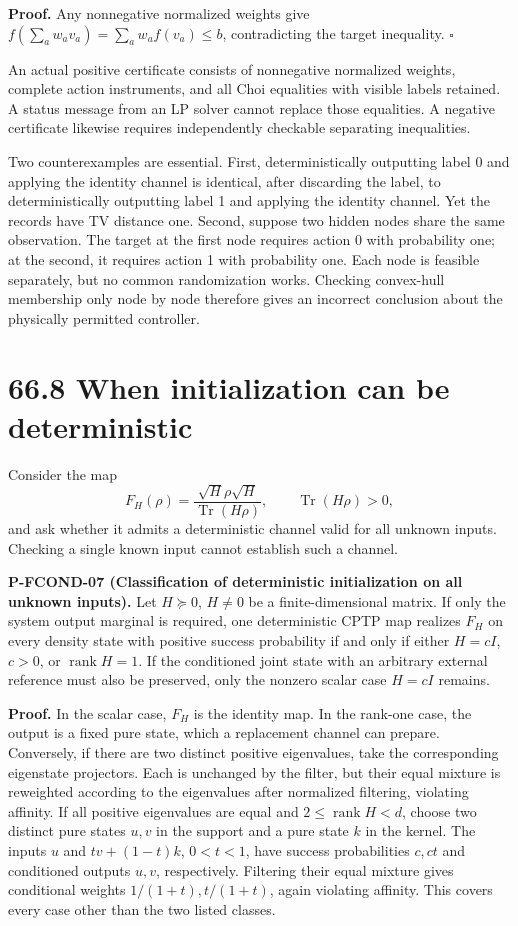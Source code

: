 \documentclass[
  11pt,
  oneside]{book}
\begin{document}
\textbf{Proof.} Any nonnegative normalized weights give
\(f(\sum_aw_av_a)=\sum_aw_af(v_a)\le b\), contradicting the target
inequality. \(\square\)

An actual positive certificate consists of nonnegative normalized
weights, complete action instruments, and all Choi equalities with
visible labels retained. A status message from an LP solver cannot
replace those equalities. A negative certificate likewise requires
independently checkable separating inequalities.

Two counterexamples are essential. First, deterministically outputting
label 0 and applying the identity channel is identical, after discarding
the label, to deterministically outputting label 1 and applying the
identity channel. Yet the records have TV distance one. Second, suppose
two hidden nodes share the same observation. The target at the first
node requires action 0 with probability one; at the second, it requires
action 1 with probability one. Each node is feasible separately, but no
common randomization works. Checking convex-hull membership only node by
node therefore gives an incorrect conclusion about the physically
permitted controller.

\section{66.8 When initialization can be deterministic}

Consider the map \[
F_H(\rho)=\frac{\sqrt H\rho\sqrt H}{\operatorname{Tr}(H\rho)},\qquad
\operatorname{Tr}(H\rho)>0,
\] and ask whether it admits a deterministic channel valid for all
unknown inputs. Checking a single known input cannot establish such a
channel.

\label{p-fcond-07}{} \textbf{P-FCOND-07 (Classification
of deterministic initialization on all unknown inputs).} Let
\(H\succeq0\), \(H\ne0\) be a finite-dimensional matrix. If only the
system output marginal is required, one deterministic CPTP map realizes
\(F_H\) on every density state with positive success probability if and
only if either \(H=cI\), \(c>0\), or \(\operatorname{rank}H=1\). If the
conditioned joint state with an arbitrary external reference must also
be preserved, only the nonzero scalar case \(H=cI\) remains.

\textbf{Proof.} In the scalar case, \(F_H\) is the identity map. In the
rank-one case, the output is a fixed pure state, which a replacement
channel can prepare. Conversely, if there are two distinct positive
eigenvalues, take the corresponding eigenstate projectors. Each is
unchanged by the filter, but their equal mixture is reweighted according
to the eigenvalues after normalized filtering, violating affinity. If
all positive eigenvalues are equal and \(2\le\operatorname{rank}H<d\),
choose two distinct pure states \(u,v\) in the support and a pure state
\(k\) in the kernel. The inputs \(u\) and \(t v+(1-t)k\), \(0<t<1\),
have success probabilities \(c,ct\) and conditioned outputs \(u,v\),
respectively. Filtering their equal mixture gives conditional weights
\(1/(1+t),t/(1+t)\), again violating affinity. This covers every case
other than the two listed classes.
\end{document}
